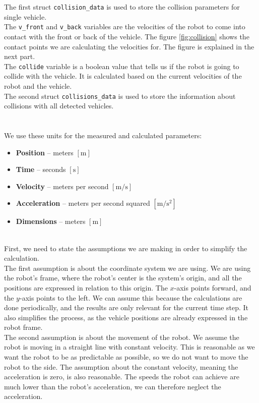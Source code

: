         The first struct \texttt{collision\_data} is used to store the collision parameters for single vehicle.\\
        The \texttt{v\_front} and \texttt{v\_back} variables are the velocities of the robot to come into contact with the front or back of the vehicle. The figure \ref{fig:collision} shows the contact points we are calculating the velocities for. The figure is explained in the next part.\\
        The \texttt{collide} variable is a boolean value that tells us if the robot is going to collide with the vehicle. It is calculated based on the current velocities of the robot and the vehicle.\\
        The second struct \texttt{collisions\_data} is used to store the information about collisions with all detected vehicles.\\\\
    \\
        We use these units for the measured and calculated parameters:
        \begin{itemize}
            \item \textbf{Position} -- meters $[\si{\m}]$
            \item \textbf{Time} -- seconds $[\si{\s}]$
            \item \textbf{Velocity} -- meters per second $[\si{\m\per\s}]$
            \item \textbf{Acceleration} -- meters per second squared $[\si{\m\per\square\s}]$
            \item \textbf{Dimensions} -- meters $[\si{\m}]$
        \end{itemize}
    \\
        First, we need to state the assumptions we are making in order to simplify the calculation.\\
        The first assumption is about the coordinate system we are using. We are using the robot's frame, where the robot's center is the system's origin, and all the positions are expressed in relation to this origin. The $x$-axis points forward, and the $y$-axis points to the left. We can assume this because the calculations are done periodically, and the results are only relevant for the current time step. It also simplifies the process, as the vehicle positions are already expressed in the robot frame.\\
        The second assumption is about the movement of the robot. We assume the robot is moving in a straight line with constant velocity. This is reasonable as we want the robot to be as predictable as possible, so we do not want to move the robot to the side. The assumption about the constant velocity, meaning the acceleration is zero, is also reasonable. The speeds the robot can achieve are much lower than the robot's acceleration, we can therefore neglect the acceleration.\\
